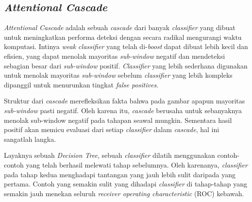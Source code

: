 \subsection{\emph{Attentional Cascade}}

\emph{Attentional Cascade} adalah sebuah \emph{cascade} dari banyak 
\emph{classifier} yang dibuat untuk meningkatkan performa deteksi dengan secara radikal mengurangi waktu 
komputasi. Intinya \emph{weak classifier} yang telah di-\emph{boost} dapat dibuat lebih 
kecil dan efisien, yang dapat menolak mayoritas \emph{sub-window} negatif dan 
mendeteksi sebagian besar dari \emph{sub-window} positif. \emph{Classifier} yang lebih 
sederhana digunakan untuk menolak mayoritas \emph{sub-window} sebelum \emph{classifier} 
yang lebih kompleks dipanggil untuk menurunkan tingkat \emph{false positives}.

Struktur dari \emph{cascade} merefleksikan 
fakta bahwa pada gambar apapun mayoritas \emph{sub-window} pasti negatif. 
Oleh karena itu, \emph{cascade} berusaha untuk sebanyaknya menolak sub-window 
negatif pada tahapan seawal mungkin. Sementara hasil positif 
akan memicu evaluasi dari setiap \emph{classifier} dalam \emph{cascade}, 
hal ini sangatlah langka.

Layaknya sebuah \emph{Decision Tree}, sebuah \emph{classifier} dilatih menggunakan 
contoh-contoh yang telah berhasil melewati tahap sebelumnya. Oleh karenanya, 
\emph{classifier} pada tahap kedua menghadapi tantangan yang jauh lebih sulit 
daripada yang pertama. Contoh yang semakin sulit yang dihadapi \emph{classifier} 
di tahap-tahap yang semakin jauh menekan seluruh \emph{receiver operating characteristic} (ROC) 
kebawah.

